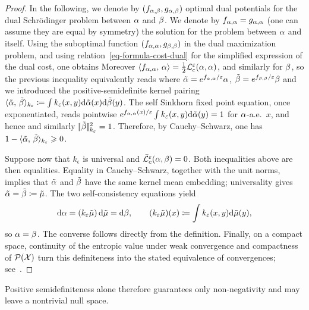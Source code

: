 \begin{proof}
	In the following, we denote by $(f_{\alpha,\beta},g_{\alpha,\beta})$ optimal dual potentials for the
	dual Schr\"odinger problem between $\alpha$ and $\beta$.
	We denote by $f_{\alpha,\alpha}=g_{\alpha,\alpha}$ (one can assume they are equal by symmetry) the solution for the problem between $\alpha$ and itself.
	Using the suboptimal function $(f_{\alpha,\alpha},g_{\beta,\beta})$ in the dual maximization problem, and using relation~\eqref{eq-formula-cost-dual} for the simplified expression of the dual cost, one obtains
	Moreover $\langle f_{\alpha,\alpha},\,\alpha\rangle = \frac{1}{2}\mathcal{L}_c^\varepsilon(\alpha,\alpha)$, and similarly for $\beta$, so the previous inequality equivalently reads
		where $\tilde{\alpha}=e^{f_{\alpha,\alpha}/\varepsilon} \alpha$, $\tilde{\beta}=e^{f_{\beta,\beta}/\varepsilon} \beta$
		and we introduced the positive-semidefinite kernel pairing
		$\langle \tilde{\alpha},\,\tilde{\beta}\rangle_{k_\varepsilon} \coloneqq \int k_\varepsilon(x,y) \mathrm{d}\tilde{\alpha}(x) \mathrm{d}\tilde{\beta}(y)$.
	The self Sinkhorn fixed point equation, once exponentiated, reads pointwise
	$e^{f_{\alpha,\alpha}(x)/\varepsilon}\int k_\varepsilon(x,y)\mathrm{d}\tilde{\alpha}(y)=1$ for $\alpha$-a.e.\ $x$,
	and hence
		and similarly $|\!| \tilde {\beta} |\!|_{k_\varepsilon}^2=1$. Therefore, by Cauchy--Schwarz, one has
		$1 - \langle \tilde{\alpha},\,\tilde{\beta}\rangle_{k_\varepsilon} \geqslant 0$.

	Suppose now that $k_\epsilon$ is universal and $\bar{\mathcal{L}}_c^\varepsilon(\alpha,\beta)=0$. Both inequalities above are then equalities. Equality in Cauchy--Schwarz, together with the unit norms, implies that $\tilde{\alpha}$ and $\tilde{\beta}$ have the same kernel mean embedding; universality gives $\tilde{\alpha}=\tilde{\beta}\coloneqq\tilde\mu$. The two self-consistency equations yield
	\[
		\mathrm{d}\alpha=(k_\varepsilon\tilde\mu)\,\mathrm{d}\tilde\mu=\mathrm{d}\beta,
		\qquad
		(k_\varepsilon\tilde\mu)(x)\coloneqq\int k_\varepsilon(x,y)\mathrm{d}\tilde\mu(y),
	\]
	so $\alpha=\beta$. The converse follows directly from the definition. Finally, on a compact space, continuity of the entropic value under weak convergence and compactness of $\mathcal{P}(\mathcal{X})$ turn this definiteness into the stated equivalence of convergences; see~\cite{feydy2018interpolating}.
\end{proof}
Positive semidefiniteness alone therefore guarantees only non-negativity and may leave a nontrivial null space.


